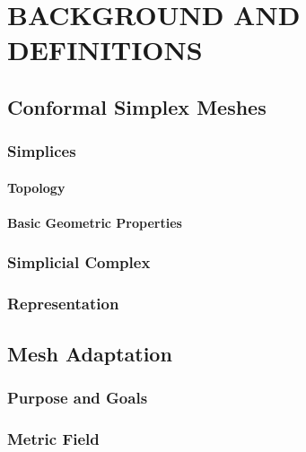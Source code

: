 
\chapter{BACKGROUND AND DEFINITIONS}
\label{chap:back}

\section{Conformal Simplex Meshes}

\subsection{Simplices}

\subsubsection{Topology}

\subsubsection{Basic Geometric Properties}

\subsection{Simplicial Complex}

\subsection{Representation}

\section{Mesh Adaptation}

\subsection{Purpose and Goals}

\subsection{Metric Field}

